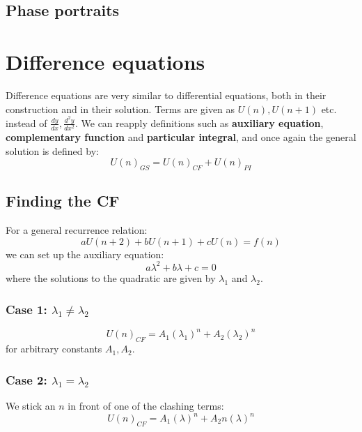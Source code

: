 \documentclass{scrartcl}
\begin{document}
\subsection{Phase portraits}

\section{Difference equations}

Difference equations are very similar to differential equations, both in their construction and in their solution. Terms are given as $ U(n), U(n+1) $ etc. instead of $ \frac{dy}{dx}, \frac{d^{2} y}{dx^{2}} $. We can reapply definitions such as \textbf{auxiliary equation}, \textbf{complementary function} and \textbf{particular integral}, and once again the general solution is defined by:
\begin{equation} \label{generalformdifference}
U(n)_{GS} = U(n)_{CF} + U(n)_{PI}
\end{equation}

\subsection{Finding the CF}

For a general recurrence relation:
\begin{equation}
aU(n+2) + bU(n+1) + cU(n) = f(n)
\end{equation}
we can set up the auxiliary equation:
\begin{equation}
a \lambda^{2} + b \lambda + c = 0
\end{equation}
where the solutions to the quadratic are given by $ \lambda_{1} $ and $ \lambda_{2} $.

\subsubsection*{Case 1: $ \lambda_{1} \neq \lambda_{2} $}

\begin{equation}
U(n)_{CF} = A_{1} (\lambda_{1})^{n} + A_{2} (\lambda_{2})^{n}
\end{equation}
for arbitrary constants $ A_{1}, A_{2} $.

\subsubsection*{Case 2: $ \lambda_{1} = \lambda_{2} $}

We stick an $ n $ in front of one of the clashing terms:
\begin{equation}
U(n)_{CF} = A_{1} (\lambda)^{n} + A_{2} n(\lambda)^{n}
\end{equation}
\end{document}
